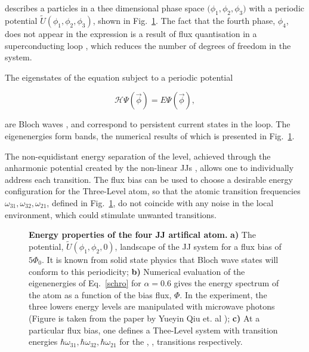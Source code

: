   \noindent describes a particles in a thee dimensional phase space $\big( \phi_1,\phi_2,\phi_3 \big)$ with a periodic potential $ \tilde{U}(\phi_1,\phi_2,\phi_3) $, shown in Fig.~\ref{theoWells}. The fact that the fourth phase, $ \phi_4 $, does not appear in the expression is a result of flux quantisation in a superconducting loop \cite{IntroductiontoSolidStatePhysics}, which reduces the number of degrees of freedom in the system.
  
  The eigenstates of the \schrodinger equation subject to a periodic potential
  
  \begin{equation}
	  \mathcal{H} \varPsi(\vec{\phi})  = E \varPsi(\vec{\phi}),
	  \label{schro}
  \end{equation}
  
  \noindent are Bloch waves \cite{TheoryoftheBloch-waveoscillationsinsmallJosephsonjunctions}, and correspond to persistent current states in the loop. The eigenenergies form bands, the numerical results of which is presented in Fig.~\ref{theoWells}. 
  
  The non-equidistant energy separation of the level, achieved through the anharmonic potential created by the non-linear JJs \cite{ioChunHoi}, allows one to individually address each transition. The flux bias can be used to choose a desirable energy configuration for the Three-Level atom, so that the atomic transition frequencies $ \omega_{31}, \omega_{32}, \omega_{21}$, defined in Fig.~\ref{theoWells}, do not coincide with any noise in the local environment, which could stimulate unwanted transitions.
  
  \begin{figure}
  	\caption{\small\textbf{Energy properties of the four JJ artifical atom.} \textbf{a)} The potential, $ \tilde{U}(\phi_1,\phi_2,0)$, landscape of the JJ system for a flux bias of $ 5\Phi_0 $. It is known from solid state physics that Bloch wave states will conform to this periodicity; \textbf{b)} Numerical evaluation of the eigenenergies of Eq.~\eqref{schro} for $ \alpha=0.6 $ gives the energy spectrum of the atom as a function of the bias flux, $ \Phi $. In the experiment, the three lowers energy levels are manipulated with microwave photons (Figure is taken from the paper by  Yueyin Qiu et. al \cite{FourJunctionSuperconductingCircuit}); \textbf{c)} At a particular flux bias, one defines a Thee-Level system with transition energies $ \hbar\omega_{31},\hbar\omega_{32},\hbar\omega_{21} $ for the \lra{}, \lra{}, \lra{} transitions respectively.}
  	\label{theoWells}
  \end{figure}
   
